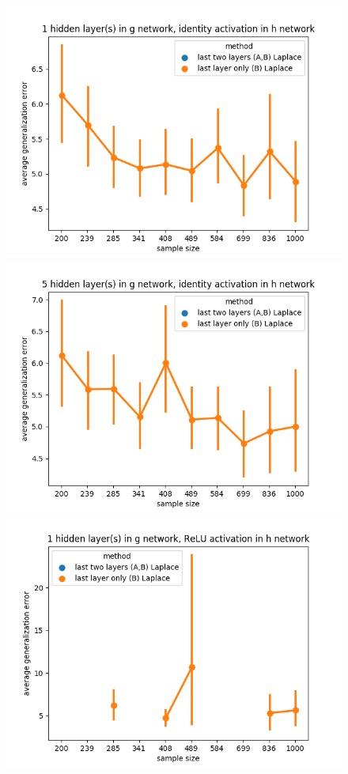 \documentclass[11pt]{article}
\numberwithin{equation}{section}
\theoremstyle{plain}
\theoremstyle{definition}
\begin{document}
\begin{figure}[t!]
	\begin{center}
		\includegraphics[scale=0.45]{laplace_taskid4.png}
		\includegraphics[scale=0.45]{laplace_taskid5.png}
		\includegraphics[scale=0.45]{laplace_taskid6.png}

\end{center}
\end{figure}
\end{document}
